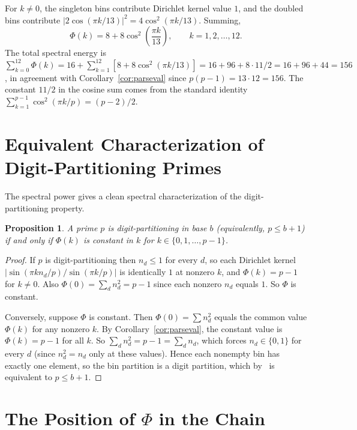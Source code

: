 \documentclass[12pt]{amsart}
\newtheorem{proposition}[theorem]{Proposition}
\theoremstyle{definition}
\theoremstyle{remark}
\begin{document}
For $k \ne 0$, the singleton bins contribute Dirichlet
kernel value $1$, and the doubled bins contribute
$|2 \cos(\pi k/13)|^2 = 4 \cos^2(\pi k/13)$. Summing,
\[
\Phi(k) = 8 + 8 \cos^2\!\left(\frac{\pi k}{13}\right),
\qquad k = 1, 2, \ldots, 12.
\]
The total spectral energy is
$\sum_{k=0}^{12} \Phi(k) = 16 + \sum_{k=1}^{12}
[8 + 8\cos^2(\pi k/13)] = 16 + 96 + 8 \cdot 11/2
= 16 + 96 + 44 = 156$, in agreement with
Corollary~\ref{cor:parseval} since
$p(p-1) = 13 \cdot 12 = 156$. The constant $11/2$ in
the cosine sum comes from the standard identity
$\sum_{k=1}^{p-1} \cos^2(\pi k/p) = (p{-}2)/2$.

\section{Equivalent Characterization of Digit-Partitioning Primes}

The spectral power gives a clean spectral characterization
of the digit-partitioning property.

\begin{proposition}\label{prop:dp-flat}
A prime $p$ is digit-partitioning in base $b$
(equivalently, $p \le b{+}1$) if and only if
$\Phi(k)$ is constant in $k$ for $k \in \{0, 1, \ldots, p{-}1\}$.
\end{proposition}

\begin{proof}
If $p$ is digit-partitioning then $n_d \le 1$ for every $d$,
so each Dirichlet kernel
$|\sin(\pi k n_d/p)/\sin(\pi k/p)|$ is identically $1$ at
nonzero $k$, and $\Phi(k) = p{-}1$ for $k \ne 0$.
Also $\Phi(0) = \sum_d n_d^2 = p{-}1$ since each
nonzero $n_d$ equals $1$. So $\Phi$ is constant.

Conversely, suppose $\Phi$ is constant. Then $\Phi(0) =
\sum n_d^2$ equals the common value $\Phi(k)$ for any
nonzero $k$. By Corollary~\ref{cor:parseval}, the
constant value is $\Phi(k) = p - 1$ for all $k$.
So $\sum_d n_d^2 = p - 1 = \sum_d n_d$, which forces
$n_d \in \{0, 1\}$ for every $d$ (since $n_d^2 = n_d$
only at these values). Hence each nonempty bin has exactly
one element, so the bin partition is a digit partition,
which by~\cite{paper2} is equivalent to $p \le b{+}1$.
\end{proof}

\section{The Position of $\Phi$ in the Chain}
\end{document}
